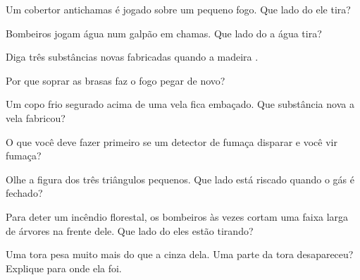 \begin{exercise}[$\star$]\label{exo:g4:what-a-fire-needs:3}
Um cobertor antichamas é jogado sobre um pequeno fogo. Que lado do
 ele tira?
\end{exercise}

\begin{exercise}[$\star$]\label{exo:g4:what-a-fire-needs:4}
Bombeiros jogam água num galpão em chamas. Que lado do 
a água tira?
\end{exercise}

\begin{exercise}[$\star$]\label{exo:g4:what-a-fire-needs:5}
Diga três substâncias novas fabricadas quando a madeira .
\end{exercise}

\begin{exercise}[$\star$]\label{exo:g4:what-a-fire-needs:6}
Por que soprar as brasas faz o fogo pegar de novo?
\end{exercise}

\begin{exercise}[$\star$]\label{exo:g4:what-a-fire-needs:7}
Um copo frio segurado acima de uma vela fica embaçado. Que substância
nova a vela fabricou?
\end{exercise}

\begin{exercise}[$\star$]\label{exo:g4:what-a-fire-needs:8}
O que você deve fazer primeiro se um detector de fumaça disparar e você
vir fumaça?
\end{exercise}

\begin{exercise}[$\star$]\label{exo:g4:what-a-fire-needs:9}
Olhe a figura dos três triângulos pequenos. Que lado está riscado quando
o gás é fechado?
\end{exercise}

\begin{exercise}[$\star\star$]\label{exo:g4:what-a-fire-needs:10}
Para deter um incêndio florestal, os bombeiros às vezes cortam uma faixa
larga de árvores na frente dele. Que lado do  eles
estão tirando?
\end{exercise}

\begin{exercise}[$\star\star$]\label{exo:g4:what-a-fire-needs:11}
Uma tora pesa muito mais do que a cinza dela. Uma parte da tora
desapareceu? Explique para onde ela foi.
\end{exercise}

